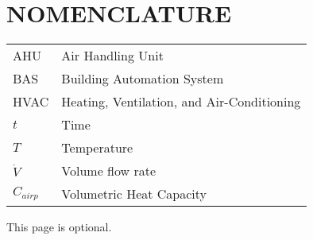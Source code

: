 %
%
%


\chapter*{NOMENCLATURE}

\begin{tabular}{ll}
AHU  & Air Handling Unit\tabularnewline
BAS & Building Automation System\tabularnewline
HVAC & Heating, Ventilation, and Air-Conditioning\tabularnewline
\(t\)  & Time\tabularnewline
\(T\) & Temperature\tabularnewline
\(\dot{V}\) & Volume flow rate \tabularnewline 
\(C_{airp}\) & Volumetric Heat Capacity \tabularnewline
\end{tabular}


\vspace{2em}

This page is optional.

\pagebreak{}